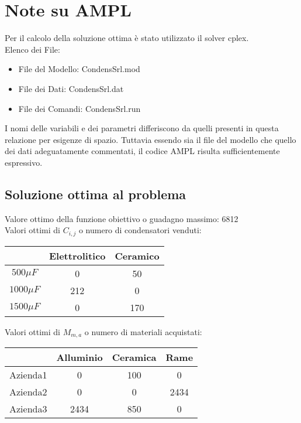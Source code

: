 \documentclass[11pt,a4paper]{article}
\begin{document}
\section{Note su AMPL}
Per il calcolo della soluzione ottima è stato utilizzato il solver cplex.\\
Elenco dei File:
\begin{itemize}
\item{File del Modello: CondensSrl.mod}
\item{File dei Dati: CondensSrl.dat}
\item{File dei Comandi: CondensSrl.run}
\end{itemize}
I nomi delle variabili e dei parametri differiscono da quelli presenti in questa relazione per esigenze di spazio.
Tuttavia essendo sia il file del modello che quello dei dati adeguatamente commentati, il codice AMPL risulta sufficientemente espressivo.
\subsection{Soluzione ottima al problema}
Valore ottimo della funzione obiettivo o guadagno massimo: 6812\\
Valori ottimi di $C_{i,j}$ o numero di condensatori venduti: \\
\begin{center}
\begin{tabular}{|c|c|c|}
\hline
             & Elettrolitico & Ceramico \\
\hline
$500 \mu F$  &       0       &    50    \\
\hline
$1000 \mu F$ &       212     &    0     \\
\hline
$1500 \mu F$ &       0       &    170   \\
\hline
\end{tabular}
\end{center}
Valori ottimi di $M_{m,a}$ o numero di materiali acquistati: \\
\begin{center}
\begin{tabular}{|c|c|c|c|}
\hline
         & Alluminio & Ceramica & Rame \\
\hline
Azienda1 &     0     &    100   &  0   \\
\hline
Azienda2 &     0     &    0     &  2434\\
\hline
Azienda3 &     2434  &    850   &  0   \\
\hline
\end{tabular}
\end{center}
\end{document}

